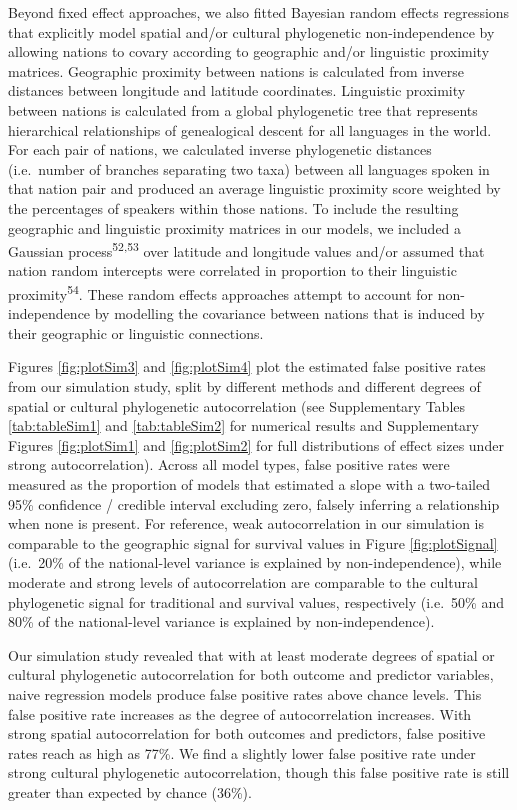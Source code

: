 \documentclass[
  man,floatsintext]{apa6}
\begin{document}
Beyond fixed effect approaches, we also fitted Bayesian random effects regressions that explicitly model spatial and/or cultural phylogenetic non-independence by allowing nations to covary according to geographic and/or linguistic proximity matrices. Geographic proximity between nations is calculated from inverse distances between longitude and latitude coordinates. Linguistic proximity between nations is calculated from a global phylogenetic tree that represents hierarchical relationships of genealogical descent for all languages in the world. For each pair of nations, we calculated inverse phylogenetic distances (i.e.~number of branches separating two taxa) between all languages spoken in that nation pair and produced an average linguistic proximity score weighted by the percentages of speakers within those nations. To include the resulting geographic and linguistic proximity matrices in our models, we included a Gaussian process\textsuperscript{52,53} over latitude and longitude values and/or assumed that nation random intercepts were correlated in proportion to their linguistic proximity\textsuperscript{54}. These random effects approaches attempt to account for non-independence by modelling the covariance between nations that is induced by their geographic or linguistic connections.

Figures \ref{fig:plotSim3} and \ref{fig:plotSim4} plot the estimated false positive rates from our simulation study, split by different methods and different degrees of spatial or cultural phylogenetic autocorrelation (see Supplementary Tables \ref{tab:tableSim1} and \ref{tab:tableSim2} for numerical results and Supplementary Figures \ref{fig:plotSim1} and \ref{fig:plotSim2} for full distributions of effect sizes under strong autocorrelation). Across all model types, false positive rates were measured as the proportion of models that estimated a slope with a two-tailed 95\% confidence / credible interval excluding zero, falsely inferring a relationship when none is present. For reference, weak autocorrelation in our simulation is comparable to the geographic signal for survival values in Figure \ref{fig:plotSignal} (i.e.~20\% of the national-level variance is explained by non-independence), while moderate and strong levels of autocorrelation are comparable to the cultural phylogenetic signal for traditional and survival values, respectively (i.e.~50\% and 80\% of the national-level variance is explained by non-independence).

Our simulation study revealed that with at least moderate degrees of spatial or cultural phylogenetic autocorrelation for both outcome and predictor variables, naive regression models produce false positive rates above chance levels. This false positive rate increases as the degree of autocorrelation increases. With strong spatial autocorrelation for both outcomes and predictors, false positive rates reach as high as 77\%. We find a slightly lower false positive rate under strong cultural phylogenetic autocorrelation, though this false positive rate is still greater than expected by chance (36\%).
\end{document}
